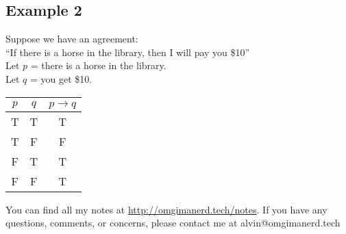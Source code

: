 \documentclass[letterpaper, 12pt]{math}
\begin{document}
\subsection*{Example 2}
Suppose we have an agreement: \\
``If there is a horse in the library, then I will pay you \$10'' \\
Let \( p \) = there is a horse in the library. \\
Let \( q \) = you get \$10.
\begin{center}
  \begin{tabular}{|c|c|c|}
    \hline
    \( p \) & \( q \) & \( p \to q \) \\ \hline
    T       & T       & T \\ \hline
    T       & F       & F \\ \hline
    F       & T       & T \\ \hline
    F       & F       & T \\ \hline
  \end{tabular}
\end{center}

\begin{center}
  You can find all my notes at \url{http://omgimanerd.tech/notes}. If you have
  any questions, comments, or concerns, please contact me at
  alvin@omgimanerd.tech
\end{center}
\end{document}
